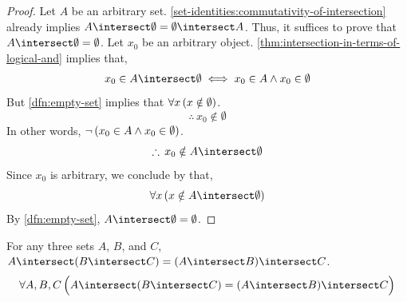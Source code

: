 \begin{proof}
    Let \( A \) be an arbitrary set. \cref{set-identities:commutativity-of-intersection} already implies
    \( A \intersect \emptyset = \emptyset \intersect A \).
    Thus, it suffices to prove that \( A \intersect \emptyset = \emptyset \). Let \( x_{0} \) be
    an arbitrary object. \cref{thm:intersection-in-terms-of-logical-and} implies that,
    \begin{equation*}
        x_{0} \in A \intersect \emptyset \iff x_{0} \in A \land x_{0} \in \emptyset
    \end{equation*}
    But \cref{dfn:empty-set} implies that \( \forall x \, \mleft( x \notin \emptyset \mright) \).
    \begin{equation*}
        \therefore \, x_{0} \notin \emptyset
    \end{equation*}
    In other words, \( \lnot \, \mleft( x_{0} \in A \land x_{0} \in \emptyset \mright) \).
    \begin{equation*}
        \therefore \, x_{0} \notin A \intersect \emptyset
    \end{equation*}
    Since \( x_{0} \) is arbitrary, we conclude by  that,
    \begin{equation*}
        \forall x \, \mleft( x \notin A \intersect \emptyset \mright)
    \end{equation*}
    By \cref{dfn:empty-set}, \( A \intersect \emptyset = \emptyset \).
\end{proof}

\begin{thm}[Associativity]
    \label{set-identities:associativity-of-intersection}
    For any three sets \( A \), \( B \), and \( C \), \( A \intersect \mleft( B \intersect C \mright) = \mleft( A \intersect B \mright) \intersect C \).
    \begin{equation*}
        \forall A,B,C \, \Big( A \intersect \mleft( B \intersect C \mright) = \mleft( A \intersect B \mright) \intersect C \Big)
    \end{equation*}
\end{thm}

